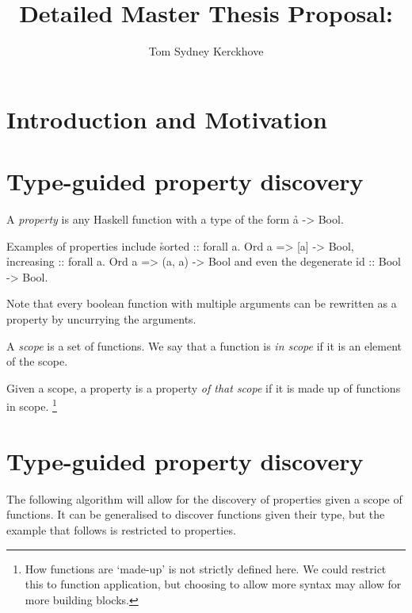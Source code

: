 \documentclass[a4paper, 11pt]{article}
\title{Detailed Master Thesis Proposal:\\\vspace{0.5cm}{\Huge Functional Property Discovery and Corresponding Test Generation in Haskell}}
\author{Tom Sydney Kerckhove}
\begin{document}
\maketitle

\section{Introduction and Motivation}

\newpage

\section{Type-guided property discovery}

\begin{de}
  A \emph{property} is any Haskell function with a type of the form \h{a -> Bool}.
\end{de}

\begin{ex}
  Examples of properties include \h{sorted :: forall a. Ord a => [a] -> Bool}, \h{increasing :: forall a. Ord a => (a, a) -> Bool} and even the degenerate \h{id :: Bool -> Bool}.

  Note that every boolean function with multiple arguments can be rewritten as a property by uncurrying the arguments.
\end{ex}

\begin{de}
  A \emph{scope} is a set of functions.
  We say that a function is \emph{in scope} if it is an element of the scope.
\end{de}

\begin{de}
  Given a scope, a property is a property \emph{of that scope} if it is made up of functions in scope.
  \footnote{How functions are `made-up' is not strictly defined here. We could restrict this to function application, but choosing to allow more syntax may allow for more building blocks.}
\end{de}

\section{Type-guided property discovery}

The following algorithm will allow for the discovery of properties given a scope of functions.
It can be generalised to discover functions given their type, but the example that follows is restricted to properties.
\end{document}
